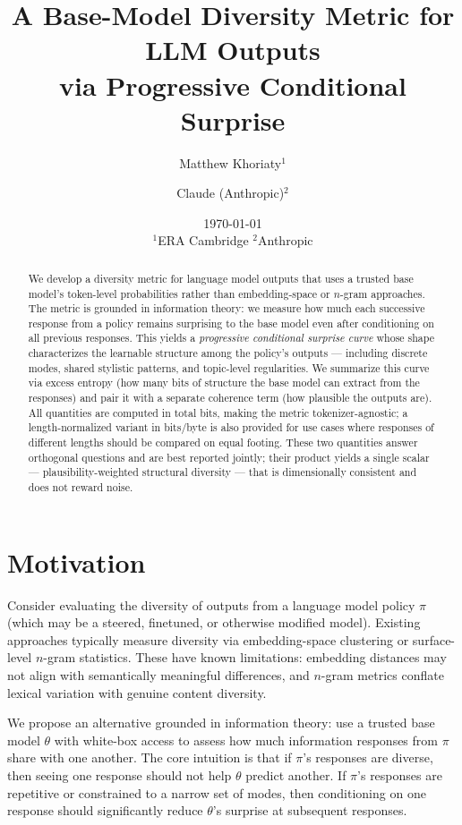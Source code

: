 \documentclass[11pt]{article}
\title{A Base-Model Diversity Metric for LLM Outputs\\via Progressive Conditional Surprise}
\author{Matthew Khoriaty$^1$ \and Claude (Anthropic)$^2$}
\date{\today\\[1em]\small $^1$ERA Cambridge \quad $^2$Anthropic}
\begin{document}
\maketitle

\begin{abstract}
We develop a diversity metric for language model outputs that uses a trusted base model's token-level probabilities rather than embedding-space or $n$-gram approaches. The metric is grounded in information theory: we measure how much each successive response from a policy remains surprising to the base model even after conditioning on all previous responses. This yields a \emph{progressive conditional surprise curve} whose shape characterizes the learnable structure among the policy's outputs --- including discrete modes, shared stylistic patterns, and topic-level regularities. We summarize this curve via excess entropy (how many bits of structure the base model can extract from the responses) and pair it with a separate coherence term (how plausible the outputs are). All quantities are computed in total bits, making the metric tokenizer-agnostic; a length-normalized variant in bits/byte is also provided for use cases where responses of different lengths should be compared on equal footing. These two quantities answer orthogonal questions and are best reported jointly; their product yields a single scalar --- plausibility-weighted structural diversity --- that is dimensionally consistent and does not reward noise.
\end{abstract}

\section{Motivation}

Consider evaluating the diversity of outputs from a language model policy $\pi$ (which may be a steered, finetuned, or otherwise modified model). Existing approaches typically measure diversity via embedding-space clustering \citep{lai2024llmmeans} or surface-level $n$-gram statistics. These have known limitations: embedding distances may not align with semantically meaningful differences, and $n$-gram metrics conflate lexical variation with genuine content diversity.

We propose an alternative grounded in information theory: use a trusted base model $\theta$ with white-box access to assess how much information responses from $\pi$ share with one another. The core intuition is that if $\pi$'s responses are diverse, then seeing one response should not help $\theta$ predict another. If $\pi$'s responses are repetitive or constrained to a narrow set of modes, then conditioning on one response should significantly reduce $\theta$'s surprise at subsequent responses.
\end{document}
